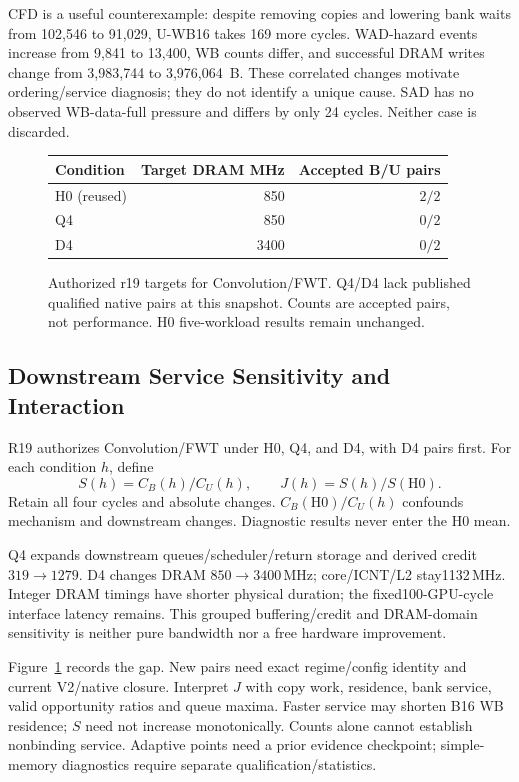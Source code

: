 \documentclass[conference,letterpaper]{IEEEtran}
\begin{document}
CFD is a useful counterexample: despite removing copies and lowering bank waits from 102,546 to 91,029, U-WB16 takes 169 more cycles. WAD-hazard events increase from 9,841 to 13,400, WB counts differ, and successful DRAM writes change from 3,983,744 to 3,976,064~B. These correlated changes motivate ordering/service diagnosis; they do not identify a unique cause. SAD has no observed WB-data-full pressure and differs by only 24 cycles. Neither case is discarded.

\begin{figure}[t]
\centering\footnotesize
\begin{tabular}{@{}lrr@{}}
\toprule
Condition & Target DRAM MHz & Accepted B/U pairs \\
\midrule
H0 (reused) & 850 & $2/2$ \\
Q4 & 850 & $0/2$ \\
D4 & 3400 & $0/2$ \\
\bottomrule
\end{tabular}
\caption{Authorized r19 targets for Convolution/FWT. Q4/D4 lack published qualified native pairs at this snapshot. Counts are accepted pairs, not performance. H0 five-workload results remain unchanged.}
\label{fig:controls}
\end{figure}

\subsection{Downstream Service Sensitivity and Interaction}
R19 authorizes Convolution/FWT under H0, Q4, and D4, with D4 pairs first. For each condition $h$, define
\begin{equation}
 S(h)=C_B(h)/C_U(h),\qquad J(h)=S(h)/S(\mathrm{H0}).
\end{equation}
Retain all four cycles and absolute changes. $C_B(\mathrm{H0})/C_U(h)$ confounds mechanism and downstream changes. Diagnostic results never enter the H0 mean.

Q4 expands downstream queues/scheduler/return storage and derived credit $319\to1279$. D4 changes DRAM $850\to3400$\,MHz; core/ICNT/L2 stay1132\,MHz. Integer DRAM timings have shorter physical duration; the fixed100-GPU-cycle interface latency remains. This grouped buffering/credit and DRAM-domain sensitivity is neither pure bandwidth nor a free hardware improvement.

Figure~\ref{fig:controls} records the gap. New pairs need exact regime/config identity and current V2/native closure. Interpret $J$ with copy work, residence, bank service, valid opportunity ratios and queue maxima. Faster service may shorten B16 WB residence; $S$ need not increase monotonically. Counts alone cannot establish nonbinding service. Adaptive points need a prior evidence checkpoint; simple-memory diagnostics require separate qualification/statistics.
\end{document}
